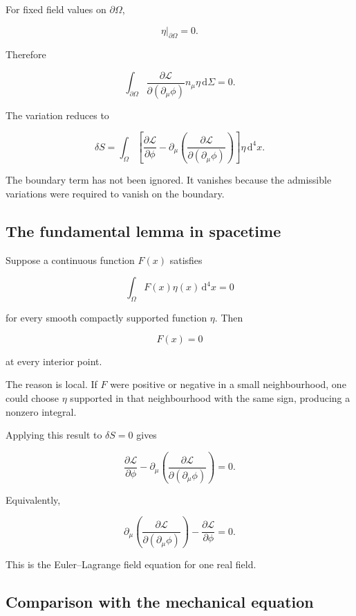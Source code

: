 For fixed field values on \(\partial\Omega\),

\[
\eta|_{\partial\Omega}=0.
\]

Therefore

\[
\int_{\partial\Omega}
\frac{\partial\mathcal{L}}
{\partial(\partial_{\mu}\phi)}
n_{\mu}\eta
\,\mathrm{d}\Sigma
=0.
\]

The variation reduces to

\[
\delta S
=
\int_{\Omega}
\left[
\frac{\partial\mathcal{L}}{\partial\phi}
-
\partial_{\mu}
\left(
\frac{\partial\mathcal{L}}
{\partial(\partial_{\mu}\phi)}
\right)
\right]
\eta
\,\mathrm{d}^{4}x.
\]

The boundary term has not been ignored. It vanishes because the admissible variations were required to vanish on the boundary.

\subsection{The fundamental lemma in spacetime}

Suppose a continuous function \(F(x)\) satisfies

\[
\int_{\Omega}
F(x)\eta(x)
\,\mathrm{d}^{4}x
=0
\]

for every smooth compactly supported function \(\eta\). Then

\[
F(x)=0
\]

at every interior point.

The reason is local. If \(F\) were positive or negative in a small neighbourhood, one could choose \(\eta\) supported in that neighbourhood with the same sign, producing a nonzero integral.

Applying this result to \(\delta S=0\) gives

\[
\frac{\partial\mathcal{L}}{\partial\phi}
-
\partial_{\mu}
\left(
\frac{\partial\mathcal{L}}
{\partial(\partial_{\mu}\phi)}
\right)
=0.
\]

Equivalently,

\[
\boxed{
\partial_{\mu}
\left(
\frac{\partial\mathcal{L}}
{\partial(\partial_{\mu}\phi)}
\right)
-
\frac{\partial\mathcal{L}}{\partial\phi}
=0
}.
\]

This is the Euler--Lagrange field equation for one real field.

\subsection{Comparison with the mechanical equation}

